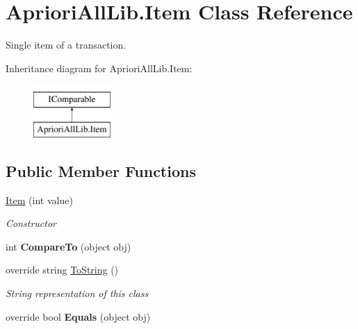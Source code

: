 \hypertarget{class_apriori_all_lib_1_1_item}{\section{Apriori\-All\-Lib.\-Item Class Reference}
\label{class_apriori_all_lib_1_1_item}
}


Single item of a transaction.  


Inheritance diagram for Apriori\-All\-Lib.\-Item\-:\begin{figure}[H]
\begin{center}
\leavevmode
\includegraphics[height=2.000000cm]{class_apriori_all_lib_1_1_item}
\end{center}
\end{figure}
\subsection*{Public Member Functions}
\begin{DoxyCompactItemize}
\item 
\hyperlink{class_apriori_all_lib_1_1_item_aed218e4e6b27b6ac780be54f6f483d59}{Item} (int value)
\begin{DoxyCompactList}\small\item\em Constructor \end{DoxyCompactList}\item 
\hypertarget{class_apriori_all_lib_1_1_item_a0b0e9bbfeea95abed90935db84beb999}{int {\bfseries Compare\-To} (object obj)}\label{class_apriori_all_lib_1_1_item_a0b0e9bbfeea95abed90935db84beb999}

\item 
override string \hyperlink{class_apriori_all_lib_1_1_item_a020b36119d00b63670da5688967dc147}{To\-String} ()
\begin{DoxyCompactList}\small\item\em String representation of this class \end{DoxyCompactList}\item 
\hypertarget{class_apriori_all_lib_1_1_item_a69489ac60415029faf0dc3e7dc926e62}{override bool {\bfseries Equals} (object obj)}\label{class_apriori_all_lib_1_1_item_a69489ac60415029faf0dc3e7dc926e62}

\end{DoxyCompactItemize}
